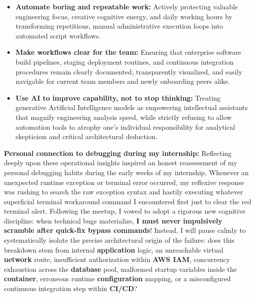 \begin{itemize}
  conceptually confined within the narrow execution boundaries of
  isolated ticket items, actively training one's engineering intuition
  to anticipate how modifying a localized application configuration
  might send rippling performance shocks across interconnected
  infrastructure networks.
\item
  \textbf{Automate boring and repeatable work:} Actively protecting
  valuable engineering focus, creative cognitive energy, and daily
  working hours by transforming repetitious, manual administrative
  execution loops into automated script workflows.
\item
  \textbf{Make workflows clear for the team:} Ensuring that enterprise
  software build pipelines, staging deployment routines, and continuous
  integration procedures remain clearly documented, transparently
  visualized, and easily navigable for current team members and newly
  onboarding peers alike.
\item
  \textbf{Use AI to improve capability, not to stop thinking:} Treating
  generative Artificial Intelligence models as empowering intellectual
  assistants that magnify engineering analysis speed, while strictly
  refusing to allow automation tools to atrophy one's individual
  responsibility for analytical skepticism and critical architectural
  deduction.
\end{itemize}

\textbf{Personal connection to debugging during my internship:}
Reflecting deeply upon these operational insights inspired an honest
reassessment of my personal debugging habits during the early weeks of
my internship. Whenever an unexpected runtime exception or terminal
error occurred, my reflexive response was rushing to search the raw
exception syntax and hastily executing whatever superficial terminal
workaround command I encountered first just to clear the red terminal
alert. Following the meetup, I vowed to adopt a rigorous new cognitive
discipline: when technical bugs materialize, \textbf{I must never
impulsively scramble after quick-fix bypass commands}! Instead, I will
pause calmly to systematically isolate the precise architectural origin
of the failure: does this breakdown stem from internal
\textbf{application} logic, an unreachable virtual \textbf{network}
route, insufficient authorization within \textbf{AWS IAM}, concurrency
exhaustion across the \textbf{database} pool, malformed startup
variables inside the \textbf{container}, erroneous runtime
\textbf{configuration} mapping, or a misconfigured continuous
integration step within \textbf{CI/CD}?


